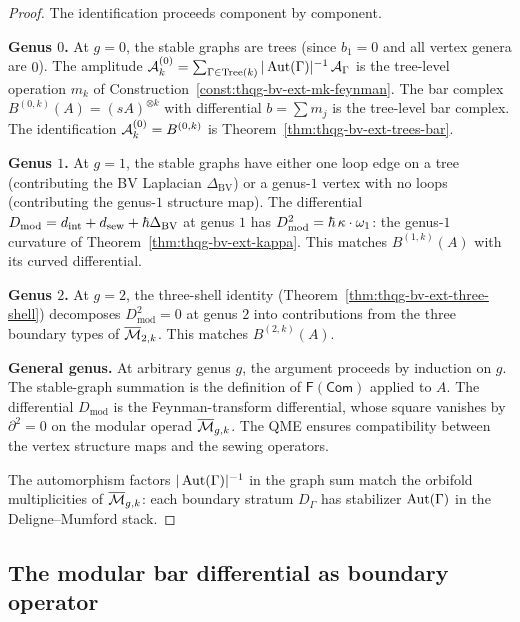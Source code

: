 \begin{proof}
The identification proceeds component by component.

\medskip\noindent\textbf{Genus $0$.}
At $g = 0$, the stable graphs are trees (since $b_1 = 0$ and all
vertex genera are $0$). The amplitude
$\mathcal{A}_k^{(0)} = \sum_{\Gamma \in \mathrm{Tree}(k)}
|\operatorname{Aut}(\Gamma)|^{-1}\,\mathcal{A}_\Gamma$ is the tree-level operation
$m_k$ of Construction~\ref{const:thqg-bv-ext-mk-feynman}. The
bar complex $B^{(0,k)}(A) = (sA)^{\otimes k}$ with differential
$b = \sum m_j$ is the tree-level bar complex. The identification
$\mathcal{A}_k^{(0)} = B^{(0,k)}$ is
Theorem~\ref{thm:thqg-bv-ext-trees-bar}.

\medskip\noindent\textbf{Genus $1$.}
At $g = 1$, the stable graphs have either one loop edge on a
tree (contributing the BV Laplacian $\Delta_{\mathrm{BV}}$) or
a genus-$1$ vertex with no loops (contributing the genus-$1$
structure map). The differential
$D_{\mathrm{mod}} = d_{\mathrm{int}} + d_{\mathrm{sew}}
+ \hbar\Delta_{\mathrm{BV}}$ at genus $1$ has
$D_{\mathrm{mod}}^2 = \hbar\,\kappa \cdot \omega_1$: the
genus-$1$ curvature of
Theorem~\ref{thm:thqg-bv-ext-kappa}. This matches
$B^{(1,k)}(A)$ with its curved differential.

\medskip\noindent\textbf{Genus $2$.}
At $g = 2$, the three-shell identity
(Theorem~\ref{thm:thqg-bv-ext-three-shell}) decomposes
$D_{\mathrm{mod}}^2 = 0$ at genus $2$ into contributions
from the three boundary types of $\overline{\mathcal{M}}_{2,k}$.
This matches $B^{(2,k)}(A)$.

\medskip\noindent\textbf{General genus.}
At arbitrary genus $g$, the argument proceeds by induction on $g$.
The stable-graph summation is the definition of
$\mathsf{F}(\mathsf{Com})$ applied to $A$. The differential
$D_{\mathrm{mod}}$ is the Feynman-transform differential, whose
square vanishes by $\partial^2 = 0$ on the modular operad
$\overline{\mathcal{M}}_{g,k}$. The QME ensures compatibility between
the vertex structure maps and the sewing operators.

The automorphism factors $|\operatorname{Aut}(\Gamma)|^{-1}$ in the graph
sum match the orbifold multiplicities of
$\overline{\mathcal{M}}_{g,k}$: each boundary stratum $D_\Gamma$ has
stabilizer $\operatorname{Aut}(\Gamma)$ in the Deligne--Mumford stack.
\end{proof}

\subsection{The modular bar differential as boundary operator}

